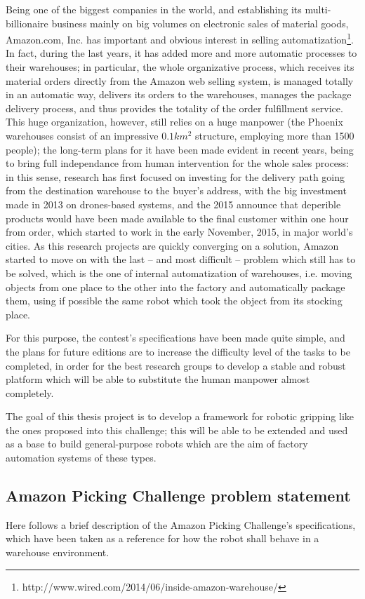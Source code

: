 Being one of the biggest companies in the world, and establishing its
multi-billionaire business mainly on big volumes on electronic sales
of material goods, Amazon.com, Inc. has important and obvious interest
in selling automatization\footnote{http://www.wired.com/2014/06/inside-amazon-warehouse/}. In fact, during the last years, it has
added more and more automatic processes to their warehouses; in
particular, the whole organizative process, which receives its
material orders directly from the Amazon web selling system, is
managed totally in an automatic way, delivers its orders to the
warehouses, manages the package delivery process, and thus provides
the totality of the order fulfillment service. This huge organization,
however, still relies on a huge manpower (the Phoenix warehouses
consist of an impressive $0.1\unit{km^2}$ structure, employing more
than 1500 people); the long-term plans for it have been made evident
in recent years, being to bring full independance from human intervention for the whole
sales process: in this sense, research has first focused on investing
for the delivery path going from the destination warehouse to the
buyer's address, with the big investment made in 2013 on drones-based
systems, and the 2015 announce that deperible products would have been
made available to the final customer within one hour from order, which
started to work in the early November, 2015, in major world's
cities. As this research projects are quickly converging on a
solution, Amazon started to move on with the last -- and most
difficult -- problem which still has to be solved, which is the one of
internal automatization of warehouses, i.e. moving objects from one
place to the other into the factory and automatically package them,
using if possible the same robot which took the object from its
stocking place.

For this purpose, the contest's specifications have been made quite simple, and the plans
for future editions are to increase the difficulty level of the tasks
to be completed, in order for the best research groups to develop a
stable and robust platform which will be able to substitute the human
manpower almost completely.

The goal of this thesis project is to develop a framework for robotic
gripping like the ones proposed into this challenge; this will be able
to be extended and used as a base to build general-purpose robots
which are the aim of factory automation systems of these types.

\subsection{Amazon Picking Challenge problem statement}
Here follows a brief description of the Amazon Picking Challenge's
specifications, which have been taken as a reference for how the robot
shall behave in a warehouse environment.

